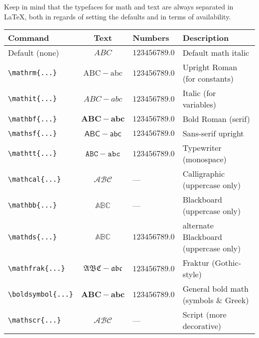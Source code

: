     Keep in mind that the typefaces for math and text are always separated in \LaTeX{}, both in regards of setting the defaults and in terms of availability.

    \begin{center}
        \small
        \begin{tabular}{l cl l}
            \toprule
            \textbf{Command}        & \textbf{Text}          & \textbf{Numbers}           & \textbf{Description}                     \\ \midrule
            Default (none)          & $ABC$                  & $123456789.0$              & Default math italic                      \\
            \verb|\mathrm{...}|     & $\mathrm{ABC-abc}$     & $\mathrm{123456789.0}$     & Upright Roman (for constants)                    \\
            \verb|\mathit{...}|     & $\mathit{ABC-abc}$     & $\mathit{123456789.0}$     & Italic (for variables)         \\
            \verb|\mathbf{...}|     & $\mathbf{ABC-abc}$     & $\mathbf{123456789.0}$     & Bold Roman (serif)                       \\
            \verb|\mathsf{...}|     & $\mathsf{ABC-abc}$     & $\mathsf{123456789.0}$     & Sans-serif upright                       \\
            \verb|\mathtt{...}|     & $\mathtt{ABC-abc}$     & $\mathtt{123456789.0}$     & Typewriter (monospace)                   \\
            \verb|\mathcal{...}|    & $\mathcal{ABC}$        & ---                        & Calligraphic (uppercase only)            \\
            \verb|\mathbb{...}|     & $\mathbb{ABC}$         & ---                        & Blackboard (uppercase only)              \\
            \verb|\mathds{...}|     & $\mathds{ABC}$         & $\mathds{123456789.0}$     & alternate Blackboard (uppercase only)    \\
            \verb|\mathfrak{...}|   & $\mathfrak{ABC-abc}$   & $\mathfrak{123456789.0}$   & Fraktur (Gothic-style)                   \\
            \verb|\boldsymbol{...}| & $\boldsymbol{ABC-abc}$ & $\boldsymbol{123456789.0}$ & General bold math (symbols \& Greek) \\
            \verb|\mathscr{...}|    & $\mathscr{ABC}$        & ---                        & Script (more decorative)    \\ \bottomrule
        \end{tabular}
    \end{center}



